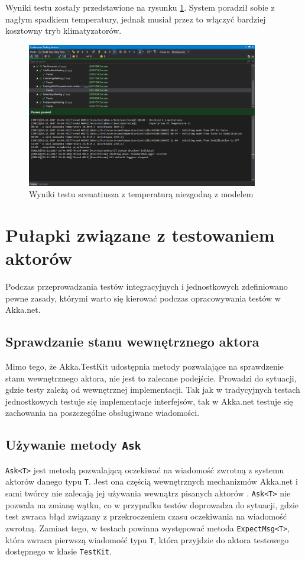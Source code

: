 Wyniki testu zostały przedstawione na rysunku \ref{fig:TemperatureAnomalies}.
System poradził sobie z nagłym spadkiem temperatury, jednak musiał przez to włączyć bardziej kosztowny tryb klimatyzatorów.
\begin{figure}[hb!]
    \centering
    \includegraphics[width=0.90\textwidth]{./screenshots/TemperatureAnomalies.png}
    \caption{Wyniki testu scenatiusza z temperaturą niezgodną z modelem}
    \label{fig:TemperatureAnomalies}    
\end{figure}

\section{Pułapki związane z testowaniem aktorów}
Podczas przeprowadzania testów integracyjnych i jednostkowych zdefiniowano pewne zasady, którymi warto się kierować podczas opracowywania testów w Akka.net.

\subsection{Sprawdzanie stanu wewnętrznego aktora}
Mimo tego, że Akka.TestKit udostępnia metody pozwalające na sprawdzenie stanu wewnętrznego aktora, nie jest to zalecane podejście. 
Prowadzi do sytuacji, gdzie testy zależą od wewnętrznej implementacji. 
Tak jak w tradycyjnych testach jednostkowych testuje się implementacje interfejsów, tak w Akka.net testuje się zachowania na poszczególne obsługiwane wiadomości.

\subsection{Używanie metody \lstinline{Ask} }
\lstinline{Ask<T>} jest metodą pozwalającą oczekiwać na wiadomość zwrotną z systemu aktorów danego typu \lstinline{T}.
Jest ona częścią wewnętrznych mechanizmów Akka.net i sami twórcy nie zalecają jej używania wewnątrz pisanych aktorów \cite{bib:AkkaNoAsk}. 
\lstinline{Ask<T>} nie pozwala na zmianę wątku, co w przypadku testów doprowadza do sytuacji, gdzie test zwraca błąd związany z przekroczeniem czasu oczekiwania na wiadomość zwrotną. Zamiast tego, w testach powinna występować metoda \lstinline{ExpectMsg<T>}, która zwraca pierwszą wiadomość typu \lstinline{T}, która przyjdzie do aktora testowego dostępnego w klasie \lstinline{TestKit}.  